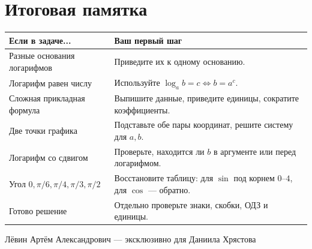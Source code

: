 \documentclass[a4paper,12pt]{article}
\begin{document}
\section*{Итоговая памятка}
\begin{tabularx}{\linewidth}{@{}p{52mm}X@{}}
\toprule
\textbf{Если в задаче...} & \textbf{Ваш первый шаг}\\\midrule
Разные основания логарифмов & Приведите их к одному основанию.\\
Логарифм равен числу & Используйте $\log_a b=c\iff b=a^c$.\\
Сложная прикладная формула & Выпишите данные, приведите единицы, сократите коэффициенты.\\
Две точки графика & Подставьте обе пары координат, решите систему для $a,b$.\\
Логарифм со сдвигом & Проверьте, находится ли $b$ в аргументе или перед логарифмом.\\
Угол $0,\pi/6,\pi/4,\pi/3,\pi/2$ & Восстановите таблицу: для $\sin$ под корнем $0$--$4$, для $\cos$ --- обратно.\\
Готово решение & Отдельно проверьте знаки, скобки, ОДЗ и единицы.\\
\bottomrule
\end{tabularx}
\vfill
\begin{center}\footnotesize\textcolor{muted}{Лёвин Артём Александрович --- эксклюзивно для Даниила Хрястова}\end{center}
\end{document}
